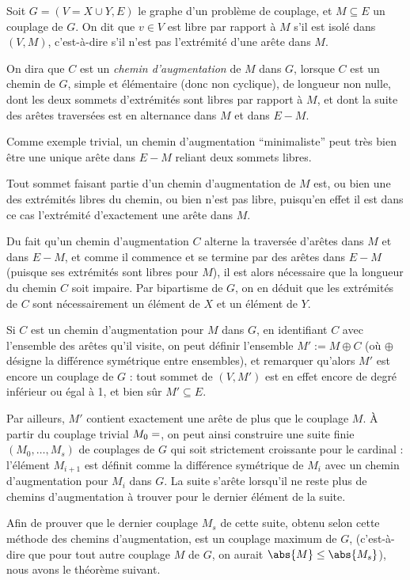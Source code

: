  \SEP\jdefi Soit $G = (V = X \cup Y, E)$ le graphe d'un problème de couplage, et $M \subseteq E$ un couplage de $G$. On dit que $v \in V$ est libre par rapport à $M$ s'il est isolé dans $(V,M)$, c'est-à-dire s'il n'est pas l'extrémité d'une arête dans $M$.
 
 On dira que $C$ est un \emph{chemin d'augmentation} de $M$ dans $G$, lorsque $C$ est un chemin de $G$, simple et élémentaire (donc non cyclique), de longueur non nulle, dont les deux sommets d'extrémités sont libres par rapport à $M$, et dont la suite des arêtes traversées est en alternance dans $M$ et dans $E \minus M$.
 \SEP
 
 Comme exemple trivial, un chemin d'augmentation ``minimaliste'' peut très bien être une unique arête dans $E\minus M$ reliant deux sommets libres.
 
 Tout sommet faisant partie d'un chemin d'augmentation de $M$ est, ou bien une des extrémités libres du chemin, ou bien n'est pas libre, puisqu'en effet il est dans ce cas l'extrémité d'exactement une arête dans $M$.
 
 Du fait qu'un chemin d'augmentation $C$ alterne la traversée d'arêtes dans $M$ et dans $E\minus M$, et comme il commence et se termine par des arêtes dans $E\minus M$ (puisque ses extrémités sont libres pour $M$), il est alors nécessaire que la longueur du chemin $C$ soit impaire. Par bipartisme de $G$, on en déduit que les extrémités de $C$ sont nécessairement un élément de $X$ et un élément de $Y$.
 
 Si $C$ est un chemin d'augmentation pour $M$ dans $G$, en identifiant $C$ avec l'ensemble des arêtes qu'il visite, on peut définir l'ensemble $M' := M \oplus C$ (où $\oplus$ désigne la différence symétrique entre ensembles), et remarquer qu'alors $M'$ est encore un couplage de $G$ : tout sommet de $(V, M')$ est en effet encore de degré inférieur ou égal à 1, et bien sûr $M' \subseteq E$.
 
 Par ailleurs, $M'$ contient exactement une arête de plus que le couplage $M$. À partir du couplage trivial $M_0 = \empty$, on peut ainsi construire une suite finie $(M_0,\dots,M_s)$ de couplages de $G$ qui soit strictement croissante pour le cardinal : l'élément $M_{i+1}$ est définit comme la différence symétrique de $M_i$ avec un chemin d'augmentation pour $M_i$ dans $G$. La suite s'arête lorsqu'il ne reste plus de chemins d'augmentation à trouver pour le dernier élément de la suite.
 
 Afin de prouver que le dernier couplage $M_s$ de cette suite, obtenu selon cette méthode des chemins d'augmentation, est un couplage maximum de $G$, (c'est-à-dire que pour tout autre couplage $M$ de $G$, on aurait $\abs{M} \leq \abs {M_s}$), nous avons le théorème suivant.
 
